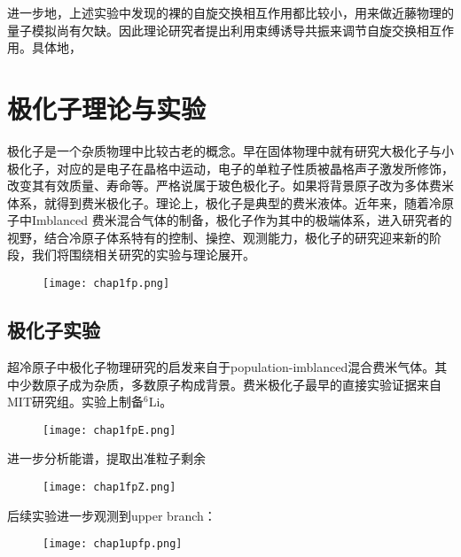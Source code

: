 进一步地，上述实验中发现的裸的自旋交换相互作用都比较小，用来做近藤物理的量子模拟尚有欠缺。因此理论研究者提出利用束缚诱导共振来调节自旋交换相互作用。具体地，



\section{极化子理论与实验}

极化子是一个杂质物理中比较古老的概念。早在固体物理中就有研究大极化子与小极化子\cite{landau1933bewegung,pekar1946autolocalization,frohlich1950xx,frohlich1954electrons,feynman1955slow,mahanmany}，对应的是电子在晶格中运动，电子的单粒子性质被晶格声子激发所修饰，改变其有效质量、寿命等。严格说属于玻色极化子。如果将背景原子改为多体费米体系，就得到费米极化子。理论上，极化子是典型的费米液体。近年来，随着冷原子中Imblanced 费米混合气体的制备，极化子作为其中的极端体系，进入研究者的视野，结合冷原子体系特有的控制、操控、观测能力，极化子的研究迎来新的阶段，我们将围绕相关研究的实验与理论展开。
\begin{figure}[!htbp]
    \centering
    \texttt{[image: chap1fp.png]}
    \label{fp}
\end{figure}

\subsection{极化子实验}
超冷原子中极化子物理研究的启发来自于population-imblanced混合费米气体。其中少数原子成为杂质，多数原子构成背景。费米极化子最早的直接实验证据来自MIT研究组\cite{Schirotzekobservation}。实验上制备${}^6$Li。
\begin{figure}[!htbp]
    \centering
    \texttt{[image: chap1fpE.png]}
    \label{fpE}
\end{figure}
进一步分析能谱，提取出准粒子剩余
\begin{figure}[!htbp]
    \centering
    \texttt{[image: chap1fpZ.png]}
    \label{fpZ}
\end{figure}

后续实验进一步观测到upper branch\cite{kohstall2012metastability,}：
\begin{figure}[!htbp]
    \centering
    \texttt{[image: chap1upfp.png]}
    \label{upfp}
\end{figure}


